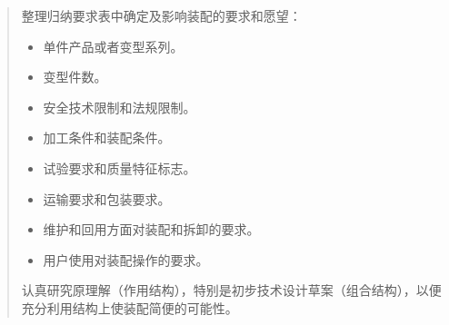 \documentclass[letterpaper,10pt,english]{sphinxmanual}
\begin{document}
\begin{quote}

整理归纳要求表中确定及影响装配的要求和愿望：
\begin{itemize}
\item {} 
单件产品或者变型系列。

\item {} 
变型件数。

\item {} 
安全技术限制和法规限制。

\item {} 
加工条件和装配条件。

\item {} 
试验要求和质量特征标志。

\item {} 
运输要求和包装要求。

\item {} 
维护和回用方面对装配和拆卸的要求。

\item {} 
用户使用对装配操作的要求。

\end{itemize}

认真研究原理解（作用结构），特别是初步技术设计草案（组合结构），以便充分利用结构上使装配简便的可能性。
\end{quote}
\end{document}
